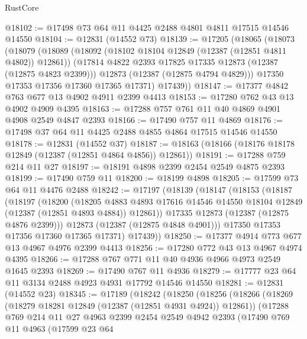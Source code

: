 \begin{lexlean}{RustCore}
\begin{coremodule}
@18102 := @17498 @73 @64 @11 @4425 @2488 @4801 @4811 @17515 @14546 @14550
@18104 := @12831 (@14552 @73)
@18139 := @17205
    (@18065
      (@18073
        (@18079
          (@18089
            (@18092 (@18102 @18104 @12849 (@12387 (@12851 @4811 @4802)) @12861))
            (@17814 @4822 @2393 @17825 @17335 @12873 (@12387 (@12875 @4823 @2399)))
            @12873
            (@12387 (@12875 @4794 @4829)))
          @17350
          @17353
          @17356
          @17360
          @17365
          @17371)
        @17439))
@18147 := @17377 @4842 @763 @677 @13 @4902 @4911 @2399 @4413
@18153 := @17280 @762 @43 @13 @4902 @4909 @4395
@18163 := @17288 @757 @761 @11 @40 @4869 @4901 @4908 @2549 @4847 @2393
@18166 := @17490 @757 @11 @4869
@18176 := @17498 @37 @64 @11 @4425 @2488 @4855 @4864 @17515 @14546 @14550
@18178 := @12831 (@14552 @37)
@18187 := @18163 (@18166 (@18176 @18178 @12849 (@12387 (@12851 @4864 @4856)) @12861))
@18191 := @17288 @759 @214 @11 @27
@18197 := @18191 @4898 @2399 @2454 @2549 @4875 @2393
@18199 := @17490 @759 @11
@18200 := @18199 @4898
@18205 := @17599 @73 @64 @11 @4476 @2488
@18242 := @17197
    (@18139
      (@18147
        (@18153
          (@18187
            (@18197
              (@18200
                (@18205
                  @4883
                  @4893
                  @17616
                  @14546
                  @14550
                  @18104
                  @12849
                  (@12387 (@12851 @4893 @4884))
                  @12861))
              @17335
              @12873
              (@12387 (@12875 @4876 @2399)))
            @12873
            (@12387 (@12875 @4848 @4901)))
          @17350
          @17353
          @17356
          @17360
          @17365
          @17371)
        @17439))
@18250 := @17377 @4914 @773 @677 @13 @4967 @4976 @2399 @4413
@18256 := @17280 @772 @43 @13 @4967 @4974 @4395
@18266 := @17288 @767 @771 @11 @40 @4936 @4966 @4973 @2549 @1645 @2393
@18269 := @17490 @767 @11 @4936
@18279 := @17777 @23 @64 @11 @3134 @2488 @4923 @4931 @17792 @14546 @14550
@18281 := @12831 (@14552 @23)
@18345 := @17189
    (@18242
      (@18250
        (@18256
          (@18266
            (@18269 (@18279 @18281 @12849 (@12387 (@12851 @4931 @4924)) @12861))
            (@17288
              @769
              @214
              @11
              @27
              @4963
              @2399
              @2454
              @2549
              @4942
              @2393
              (@17490
                @769
                @11
                @4963
                (@17599
                  @23
                  @64

\end{coremodule}
\end{lexlean}
